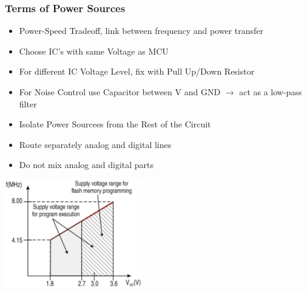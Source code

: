 \subsubsection{Terms of Power Sources }
\begin{minipage}{13cm}
	\begin{itemize}
		\item Power-Speed Tradeoff, link between frequency and power transfer
		\item Choose \acs{IC}'s with same Voltage as \acs{MCU}
		\item For different IC Voltage Level, fix with Pull Up/Down Resistor
		\item For Noise Control use Capacitor between V and \acs{GND}
        \subitem  $ \rightarrow $ act as a low-pass filter
		\item Isolate Power Sourcees from the Rest of the Circuit
		\item Route separately analog and digital lines 
		\item Do not mix analog and digital parts
	\end{itemize}
\end{minipage}
\begin{minipage}{5cm}
    \includegraphics[width=6cm]{images/PSTradeoff.png}
\end{minipage}

